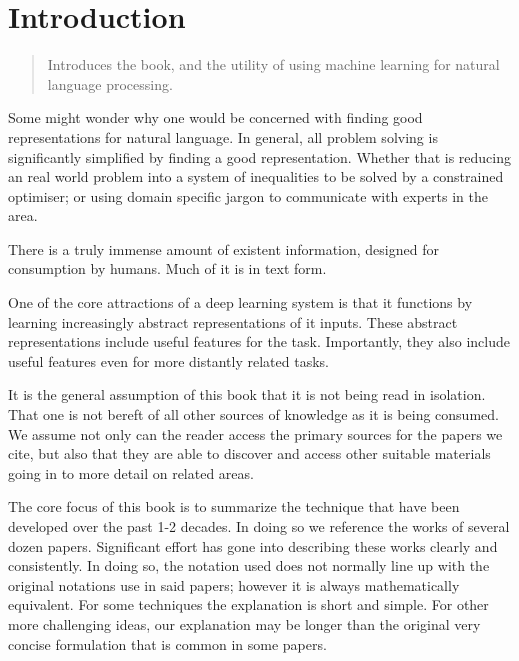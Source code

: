 \documentclass[12pt,parskip]{komatufte}
\begin{document}

\chapter{Introduction}\label{sec:introduction}
\begin{abstract}
	Introduces the book, and the utility of using machine learning for natural language processing.
\end{abstract}

Some might wonder why one would be concerned with finding good representations for natural language.
In general, all problem solving is significantly simplified by finding a good representation.
Whether that is reducing an real world problem into a system of inequalities to be solved by a constrained optimiser; or using domain specific jargon to communicate with experts in the area.


There is a truly immense amount of existent information, designed for consumption by humans.
Much of it is in text form.


One of the core attractions of a deep learning system is that it functions by learning increasingly abstract representations of it inputs.
These abstract representations include useful features for the task.
Importantly, they also include useful features even for more distantly related tasks.




It is the general assumption of this book that it is not being read in isolation.
That one is not bereft of all other sources of knowledge as it is being consumed.
We assume not only can the reader access the primary sources for the papers we cite,
but also that they are able to discover and access other suitable materials going in to more detail on related areas.

The core focus of this book is to summarize the technique that have been developed over the past 1-2 decades.
In doing so we reference the works of several dozen papers.
Significant effort has gone into describing these works clearly and consistently.
In doing so, the notation used does not normally line up with the original notations use in said papers; however it is always mathematically equivalent.
For some techniques the explanation is short and simple.
For other more challenging ideas, our explanation may be longer than the original very concise formulation that is common in some papers.
\end{document}
